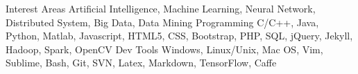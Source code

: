 \begin{cvskills}
    \cvskill
    {Interest Areas}
    {Artificial Intelligence, Machine Learning, Neural Network, Distributed System, Big Data, Data Mining}
    \cvskill
    {Programming}
    {C/C++, Java, Python, Matlab, Javascript, HTML5, CSS, Bootstrap, PHP, SQL, jQuery, Jekyll, Hadoop, Spark, OpenCV}
    \cvskill
    {Dev Tools}
    {Windows, Linux/Unix, Mac OS, Vim, Sublime, Bash, Git, SVN, Latex, Markdown, TensorFlow, Caffe}
\end{cvskills}
